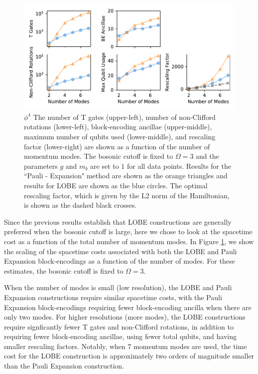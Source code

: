 \begin{figure}
    \label{fig:phi4}
    \includegraphics[width = 16cm]{figures/phi4-resolution-3.pdf}
    \caption{
        \textbf{$\phi^4$}
        The number of T gates (upper-left), number of non-Clifford rotations (lower-left), block-encoding ancillae (upper-middle), maximum number of qubits used (lower-middle), and rescaling factor (lower-right) are shown as a function of the number of momentum modes.
        The bosonic cutoff is fixed to $\Omega = 3$ and the parameters $g$ and $m_b$ are set to $1$ for all data points.
        Results for the ``Pauli - Expansion" method are shown as the orange triangles and results for LOBE are shown as the blue circles.
        The optimal rescaling factor, which is given by the L2 norm of the Hamiltonian, is shown as the dashed black crosses.
    }
\end{figure}

Since the previous results establish that LOBE constructions are generally preferred when the bosonic cutoff is large, here we chose to look at the spacetime cost as a function of the total number of momentum modes.
In Figure \ref{fig:phi4}, we show the scaling of the spacetime costs associated with both the LOBE and Pauli Expansion block-encodings as a function of the number of modes.
For these estimates, the bosonic cutoff is fixed to $\Omega = 3$.

When the number of modes is small (low resolution), the LOBE and Pauli Expansion constructions require similar spacetime costs, with the Pauli Expansion block-encodings requiring  fewer block-encoding ancilla when there are only two modes.
For higher resolutions (more modes), the LOBE constructions require signficantly fewer T gates and non-Clifford rotations, in addition to requiring fewer block-encoding ancillae, using fewer total qubits, and having smaller rescaling factors.
Notably, when $7$ momentum modes are used, the time cost for the LOBE construction is approximately two orders of magnitude smaller than the Pauli Expansion construction.
